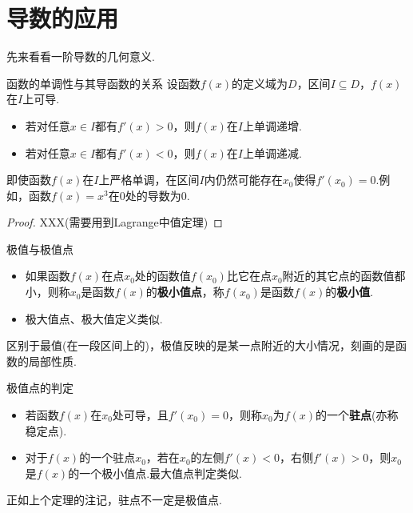 \documentclass[lang=cn, zihao=5]{elegantbook}
\begin{document}
\section{导数的应用}

先来看看一阶导数的几何意义.

\begin{theorem}{函数的单调性与其导函数的关系}
	设函数$f(x)$的定义域为$D$，区间$I \subseteq D$，$f(x)$在$I$上可导.
	\begin{itemize}
		\item 若对任意$x \in I$都有$f'(x)>0$，则$f(x)$在$I$上单调递增.
		\item 若对任意$x \in I$都有$f'(x)<0$，则$f(x)$在$I$上单调递减.
	\end{itemize}
\end{theorem}
\begin{remark}
	即使函数$f(x)$在$I$上严格单调，在区间$I$内仍然可能存在$x_0$使得$f'(x_0)=0$.例如，函数$f(x)=x^3$在$0$处的导数为$0$.
\end{remark}
\begin{proof}
	XXX(需要用到Lagrange中值定理)
\end{proof}

\begin{definition}{极值与极值点}
	\begin{itemize}
		\item 如果函数$f(x)$在点$x_0$处的函数值$f(x_0)$比它在点$x_0$附近的其它点的函数值都小，则称$x_0$是函数$f(x)$的\textbf{极小值点}，称$f(x_0)$是函数$f(x)$的\textbf{极小值}.
		\item 极大值点、极大值定义类似.
	\end{itemize}
\end{definition}
\begin{remark}
	区别于最值(在一段区间上的)，极值反映的是某一点附近的大小情况，刻画的是函数的局部性质.
\end{remark}

\begin{theorem}{极值点的判定}
	\begin{itemize}
		\item 若函数$f(x)$在$x_0$处可导，且$f'(x_0)=0$，则称$x_0$为$f(x)$的一个\textbf{驻点}(亦称稳定点).
		\item 对于$f(x)$的一个驻点$x_0$，若在$x_0$的左侧$f'(x)<0$，右侧$f'(x)>0$，则$x_0$是$f(x)$的一个极小值点.最大值点判定类似.
	\end{itemize}
\end{theorem}
\begin{remark}
	正如上个定理的注记，驻点不一定是极值点.
\end{remark}
\end{document}
